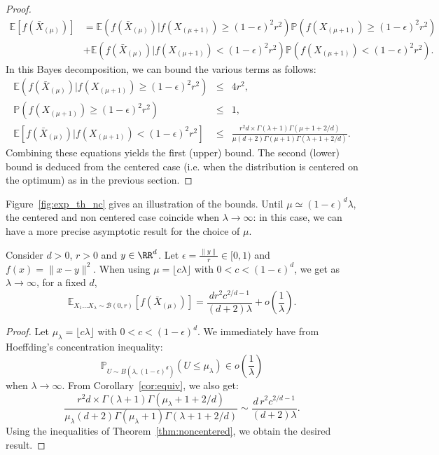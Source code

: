 \begin{proof}
\begin{align*}
\mathbb{E}\left[f(\bar{X}_{(\mu)})\right]  
&= \mathbb{E}\left(f(\bar{X}_{(\mu)})|f(X_{(\mu+1)})\geq (1-\epsilon)^{2}r^{2}\right)\mathbb{P}\left(f(X_{(\mu+1)})\geq (1-\epsilon)^{2}r^{2}\right)\\
&+\mathbb{E}\left(f(\bar{X}_{(\mu)})|f(X_{(\mu+1)})< (1-\epsilon)^{2}r^{2}\right)\mathbb{P}\left(f(X_{(\mu+1)})<(1-\epsilon)^2r^2\right).
 \end{align*}
In this Bayes decomposition, we can bound the various terms as follows:  \begin{eqnarray*}
\mathbb{E}\left(f(\bar{X}_{(\mu)})|f(X_{(\mu+1)})\geq (1-\epsilon)^2r^2\right)&\leq& 4r^2,\\
\mathbb{P}\left(f(X_{(\mu+1)})\geq (1-\epsilon)^2r^2\right)&\leq &1,\\ \mathbb{E}\left[f(\bar{X}_{(\mu)})|f(X_{(\mu+1)})< (1-\epsilon)^2r^2\right]&\leq&\frac{r^2 d\times\Gamma(\lambda+1)\Gamma(\mu+1+2/d)}{\mu(d+2)\Gamma(\mu+1)\Gamma(\lambda+1+2/d)}.
\end{eqnarray*}
Combining these equations yields the first (upper) bound.
The second (lower) bound is deduced from the centered case (i.e. when the distribution is centered on the optimum) as in the previous section.
\end{proof}
Figure~\ref{fig:exp_th_nc} gives an illustration of the bounds. Until $\mu\simeq (1-\epsilon)^{d}\lambda$, the centered and non centered case coincide when $\lambda\rightarrow\infty$: in this case, we can have a more precise asymptotic result for the choice of $\mu$.
\begin{thm}\label{thm:asymp}
Consider $d>0$, $r>0$ and $y\in\RR^d$.
Let $\epsilon = \frac{\lVert y\rVert }{r}\in [0,1)$ and $f(x) = \lVert x-y\rVert ^2$. When using $\mu=\lfloor c\lambda\rfloor$ with $0<c<(1-\epsilon)^{d}$,
we get as $\lambda\to\infty$, for a fixed $d$,
$$\mathbb{E}_{X_1...X_\lambda\sim\mathcal{B}(0,r)}\left[ f(\bar X_{(\mu)})\right]= \frac{dr^2c^{2/d-1}}{(d+2)\lambda}+o\left(\frac1\lambda\right).$$
\end{thm}
\begin{proof}
Let $\mu_\lambda=\lfloor c\lambda\rfloor$ with $0<c<(1-\epsilon)^{d}$. We  immediately have from Hoeffding's concentration inequality: $$\mathbb{P}_{U\sim B\left(\lambda,(1-\epsilon)^d\right)}\left(U\leq \mu_\lambda\right)\in o(\frac{1}{\lambda})$$ when $\lambda \rightarrow \infty$.
From Corollary~\ref{cor:equiv}, we also get: $$\frac{r^2 d\times\Gamma(\lambda+1)\Gamma(\mu_\lambda+1+2/d)}{\mu_\lambda(d+2)\Gamma(\mu_\lambda+1)\Gamma(\lambda+1+2/d)}\sim \frac{d\,r^2 c^{2/d-1}}{(d+2)\lambda}.$$
Using the inequalities of Theorem~\ref{thm:noncentered}, we obtain the desired result.
\end{proof}
